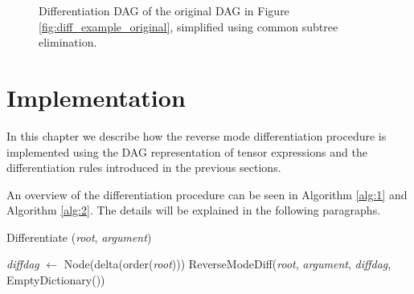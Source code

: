 \documentclass[12pt, a4paper]{report}
\begin{document}
\begin{figure}
    \centering
    \caption{Differentiation DAG of the original DAG in Figure \ref{fig:diff_example_original}, simplified using common subtree elimination.}
    \label{fig:diff_example_final}
\end{figure}

\section{Implementation}
In this chapter we describe how the reverse mode differentiation procedure is implemented using the DAG representation of tensor expressions and the differentiation rules introduced in the previous sections.

An overview of the differentiation procedure can be seen in Algorithm \ref{alg:1} and Algorithm \ref{alg:2}.
The details will be explained in the following paragraphs.

\begin{algorithm}
    \caption{Differentiate (\textit{root}, \textit{argument})}\label{alg:1}
    \begin{algorithmic}
        \State \textit{diffdag} $\gets$ Node(delta(order(\textit{root})))
        \State ReverseModeDiff(\textit{root}, \textit{argument}, \textit{diffdag}, EmptyDictionary())
    \end{algorithmic}
\end{algorithm}
\end{document}
